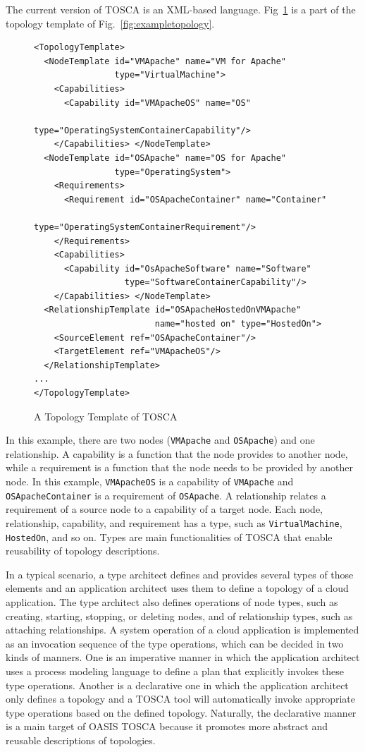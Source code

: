 \documentclass[12pt]{report}
\begin{document}
The current version of TOSCA is an XML-based language. Fig~\ref{fig:topology}
is a part of the topology template of Fig.~\ref{fig:exampletopology}.
\begin{figure}
\centering
\begin{verbatim}
<TopologyTemplate>
  <NodeTemplate id="VMApache" name="VM for Apache" 
                type="VirtualMachine">
    <Capabilities>
      <Capability id="VMApacheOS" name="OS" 
                  type="OperatingSystemContainerCapability"/>
    </Capabilities> </NodeTemplate>
  <NodeTemplate id="OSApache" name="OS for Apache" 
                type="OperatingSystem">
    <Requirements>
      <Requirement id="OSApacheContainer" name="Container" 
                   type="OperatingSystemContainerRequirement"/>
    </Requirements>
    <Capabilities>
      <Capability id="OsApacheSoftware" name="Software" 
                  type="SoftwareContainerCapability"/>
    </Capabilities> </NodeTemplate>
  <RelationshipTemplate id="OSApacheHostedOnVMApache"
                        name="hosted on" type="HostedOn">
    <SourceElement ref="OSApacheContainer"/>
    <TargetElement ref="VMApacheOS"/>
  </RelationshipTemplate>
...
</TopologyTemplate>
\end{verbatim}
\caption{A Topology Template of TOSCA}
\label{fig:topology}
\end{figure}
In this
example, there are two nodes ({\tt VMApache} and {\tt OSApache}) and
one relationship.  A capability is a function that the node provides
to another node, while a requirement is a function that the node needs
to be provided by another node. In this example, {\tt VMApacheOS} is a
capability of {\tt VMApache} and {\tt OSApacheContainer} is a
requirement of {\tt OSApache}.  A relationship relates a requirement
of a source node to a capability of a target node.  Each node,
relationship, capability, and requirement has a type, such as
{\tt VirtualMachine}, {\tt HostedOn}, and so on. Types are main
functionalities of TOSCA that enable reusability of topology
descriptions.

In a typical scenario, a type architect defines and provides several
types of those elements and an application architect uses them to
define a topology of a cloud application. The type architect also
defines operations of node types, such as creating, starting,
stopping, or deleting nodes, and of relationship types, such as
attaching relationships. A system operation of a cloud application is
implemented as an invocation sequence of the type operations, which
can be decided in two kinds of manners. One is an imperative manner in
which the application architect uses a process modeling language to
define a plan that explicitly invokes these type operations. Another is
a declarative one in which the application architect only defines a
topology and a TOSCA tool will automatically invoke appropriate type
operations based on the defined topology. Naturally, the declarative
manner is a main target of OASIS TOSCA because it promotes more
abstract and reusable descriptions of topologies.
\end{document}
